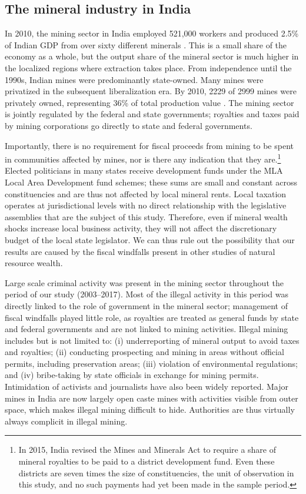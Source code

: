 \documentclass[12pt,letterpaper]{article}
\begin{document}
\subsection{The mineral industry in India}
\label{ssec:mining}

In 2010, the mining sector in India employed 521,000 workers and
produced 2.5\% of Indian GDP from over sixty different minerals
\cite{IndianBureauofMines2011c}. This is a small share of the economy
as a whole, but the output share of the mineral sector is much higher
in the localized regions where extraction takes place.
From independence until the 1990s, Indian mines were predominantly
state-owned. Many mines were privatized in the subsequent
liberalization era. By 2010, 2229 of 2999 mines were privately owned,
representing 36\% of total production value
\cite{IndianBureauofMines2011c}. The mining sector is jointly
regulated by the federal and state governments; royalties and taxes
paid by mining corporations go directly to state and federal
governments.  

Importantly, there is no requirement for fiscal proceeds from mining
to be spent in communities affected by mines, nor is there any
indication that they are.\footnote{In 2015, India revised the Mines
  and Minerals Act to require a share of mineral royalties to be paid
  to a district development fund. Even these districts are seven times
  the size of constituencies, the unit of observation in this study,
  and no such payments had yet been made in the sample period.}
Elected politicians in many states receive development funds under the
MLA Local Area Development fund schemes; these sums are small and
constant across constituencies and are thus not affected by local
mineral rents. Local taxation operates at jurisdictional levels with
no direct relationship with the legislative assemblies that are the
subject of this study. Therefore, even if mineral wealth shocks
increase local business activity, they will not affect the
discretionary budget of the local state legislator.  We can thus rule
out the possibility that our results are caused by the fiscal
windfalls present in other studies of natural resource wealth.

Large scale criminal activity was present in the mining sector
throughout the period of our study (2003--2017). Most of the illegal
activity in this period was directly linked to the role of government
in the mineral sector; management of fiscal windfalls played little
role, as royalties are treated as general funds by state and federal
governments and are not linked to mining activities. Illegal mining
includes but is not limited to: (i) underreporting of mineral output
to avoid taxes and royalties; (ii) conducting prospecting and mining
in areas without official permits, including preservation areas; (iii)
violation of environmental regulations; and (iv) bribe-taking by state
officials in exchange for mining permits. Intimidation of activists
and journalists have also been widely reported. Major mines in India
are now largely open caste mines with activities visible from outer
space, which makes illegal mining difficult to hide. Authorities are
thus virtually always complicit in illegal mining.
\end{document}
